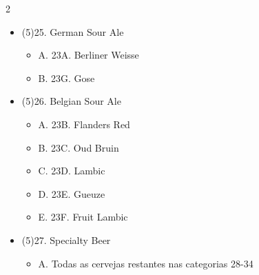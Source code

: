 \begin{multicols*}{2}
\begin{itemize}[noitemsep]
\item[] (5)25. German Sour Ale
\begin{itemize}
  \item[] A. 23A. Berliner Weisse
  \item[] B. 23G. Gose
\end{itemize}
\item[] (5)26. Belgian Sour Ale
\begin{itemize}
  \item[] A. 23B. Flanders Red
  \item[] B. 23C. Oud Bruin
  \item[] C. 23D. Lambic
  \item[] D. 23E. Gueuze
  \item[] E. 23F. Fruit Lambic
\end{itemize}
\item[] (5)27. Specialty Beer
\begin{itemize}
  \item[] A. Todas as cervejas restantes nas categorias 28-34
\end{itemize}
\end{itemize}

\end{multicols*}
